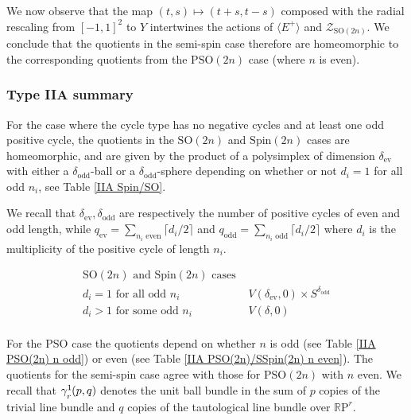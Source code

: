 \documentclass[11pt,a4paper]{article}
\def\Spin{\mathrm{Spin}}
\def\SO{\mathrm{SO}}
\def\PSO{\mathrm{PSO}}
\def\R{\mathbb{R}}
\def\cZ{\mathcal{Z}}
\def\RP{\R\mathrm{P}}
\def\cZ{{\mathcal Z}}
\def\ev{\mathrm{ev}}
\def\odd{\mathrm{odd}}
\def\ZDSO{\cZ_{\SO(2n)}}
\def\unitbundle#1#2#3{{\gamma^1\!\!\!\strut_{#1}(#2,#3)}}
\begin{document}
We now observe that the map $(t,s) \mapsto  (t+s,t-s)$ composed with the radial rescaling from $[-1,1]^2$ to $Y$ intertwines the actions of $\langle E^+\rangle$ and $\ZDSO$. We conclude that the quotients in the semi-spin case therefore are homeomorphic to the corresponding quotients from the $\PSO(2n)$ case (where $n$ is even).

\bigskip

\subsubsection{Type IIA summary}


For the case where the cycle type has no negative cycles and at least one odd positive cycle, the quotients in the $\SO(2n)$ and $\Spin(2n)$ cases are homeomorphic, and are given by the product of a polysimplex of dimension $\delta_\ev$ with either a ${\delta_\odd}$-ball or a ${\delta_\odd}$-sphere depending on whether or not $d_i=1$ for all odd $n_i$, see Table \ref{IIA Spin/SO}.

\smallskip
We recall that $\delta_\ev,\delta_\odd$ are respectively the number of positive cycles of even and odd length, while $q_\ev=\sum_{n_i\text{ even}} \lceil d_i/2\rceil$ and $q_\odd=\sum_{n_i\text{ odd}} \lceil d_i/2\rceil$ where $d_i$ is the multiplicity of the positive cycle of length $n_i$.

\smallskip

\begin{table}[h]

\[
\begin{array}{c|c}
 \SO(2n) \text{ and } \Spin(2n) \text{ cases }  \\
\hline
 d_i = 1 \text{ for all odd } n_i& V(\delta_\ev,0)\times S^{\delta_\odd}\\
 d_i > 1  \text{ for some  odd } n_i& V(\delta,0)\\
\end{array}
\]

\smallskip

\caption{\label{IIA Spin/SO}The structure of the sector associated to a conjugacy class with no negative cycles and at least one odd positive cycle in the $\SO(2n)$ and $\Spin(2n)$ cases.
}
\end{table}



For the $\PSO$ case the quotients depend on whether $n$ is odd (see Table \ref{IIA PSO(2n) n odd}) or even (see Table \ref{IIA PSO(2n)/SSpin(2n) n  even}).  The quotients for the semi-spin case agree with those for $\PSO(2n)$ with $n$ even. We recall that $\unitbundle{r}pq$ denotes the unit ball bundle in the sum of $p$ copies of the trivial line bundle and $q$ copies of the tautological line bundle over $\RP^{r}$.
\end{document}
